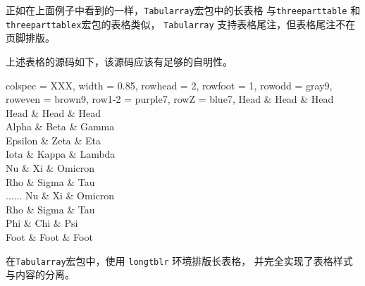 \documentclass[oneside]{book}
\begin{document}
正如在上面例子中看到的一样，\verb!Tabularray!宏包中的长表格
与\verb!threeparttable! 和 \verb!threeparttablex!宏包的表格类似，
\verb!Tabularray! 支持表格尾注，但表格尾注不在页脚排版。

\newpage

上述表格的源码如下，该源码应该有足够的自明性。

\begin{codehigh}
\begin{longtblr}[
  theme = fancy,
  caption = {一个长长长长长长长长长的表格},
  entry = {短标题},
  label = {tblr:test},
  note{a} = {第一个表注。},
  note{$\dag$} = {每二个长长长长长长长的表注。},
  remark{注意} = {一些常规说明，一些常规说明，一些常规说明。},
  remark{来源} = {自力更生，自力更生，自力更生。},
]{
  colspec = {XXX}, width = 0.85\linewidth,
  rowhead = 2, rowfoot = 1,
  row{odd} = {gray9}, row{even} = {brown9},
  row{1-2} = {purple7}, row{Z} = {blue7},
}
\hline
 Head    & Head  & Head    \\
\hline
 Head    & Head  & Head    \\
\hline
 Alpha   & Beta  & Gamma   \\
\hline
 Epsilon & Zeta       & Eta    \\
\hline
 Iota    & Kappa\TblrNote{$\dag$} & Lambda \\
\hline
 Nu      & Xi    & Omicron \\
\hline
 Rho     & Sigma & Tau     \\
\hline
......
\hline
 Nu      & Xi    & Omicron \\
\hline
 Rho     & Sigma & Tau     \\
\hline
 Phi     & Chi   & Psi     \\
\hline
 Foot    & Foot  & Foot    \\
\hline
\end{longtblr}
\end{codehigh}

在\verb!Tabularray!宏包中，使用 \verb!longtblr! 环境排版长表格，
并完全实现了表格样式与内容的分离。
\end{document}
